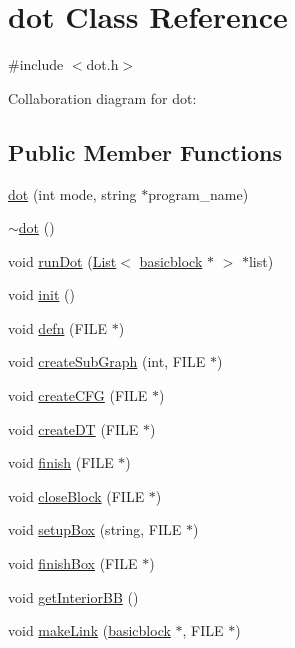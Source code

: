 \hypertarget{classdot}{
\section{dot Class Reference}
\label{classdot}
}


{\ttfamily \#include $<$dot.h$>$}



Collaboration diagram for dot:
\subsection*{Public Member Functions}
\begin{DoxyCompactItemize}
\item 
\hyperlink{classdot_af11dd579c7b133d259ac9fe60e7ae629}{dot} (int mode, string $\ast$program\_\-name)
\item 
\hyperlink{classdot_a7c31a26ba233474fd5c7857bd3d8158f}{$\sim$dot} ()
\item 
void \hyperlink{classdot_a613147e95e44f245a63a5b08418c95f9}{runDot} (\hyperlink{classList}{List}$<$ \hyperlink{classbasicblock}{basicblock} $\ast$ $>$ $\ast$list)
\item 
void \hyperlink{classdot_a5841f9acea9e636b9630e8a2ebe25382}{init} ()
\item 
void \hyperlink{classdot_af56f68484dcec4b943a6a77d261080a6}{defn} (FILE $\ast$)
\item 
void \hyperlink{classdot_a04dd7808d587869df22488a7e7a1835a}{createSubGraph} (int, FILE $\ast$)
\item 
void \hyperlink{classdot_a34bd8df7c73a49901267dc3ca9209385}{createCFG} (FILE $\ast$)
\item 
void \hyperlink{classdot_aa1638f8d762e0f431cef55da49e92ede}{createDT} (FILE $\ast$)
\item 
void \hyperlink{classdot_ad7659526d6446a2065612898c6913a41}{finish} (FILE $\ast$)
\item 
void \hyperlink{classdot_a1ecb5d30b724c5f6bb49db212f3152de}{closeBlock} (FILE $\ast$)
\item 
void \hyperlink{classdot_a27540f28ccdbe6e62d32e727561fb185}{setupBox} (string, FILE $\ast$)
\item 
void \hyperlink{classdot_ac3912d5b73db012838fb8b37c1ed00bc}{finishBox} (FILE $\ast$)
\item 
void \hyperlink{classdot_af20dc816d263a9b3496d8241c339e235}{getInteriorBB} ()
\item 
void \hyperlink{classdot_acfd091941aef16273c4ebe92ef536742}{makeLink} (\hyperlink{classbasicblock}{basicblock} $\ast$, FILE $\ast$)
\end{DoxyCompactItemize}


